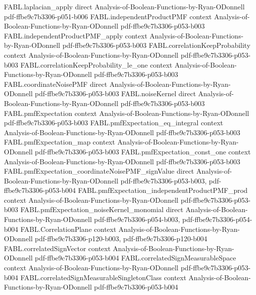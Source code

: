 \begin{theorem}
  {FABL.laplacian_apply}
  {direct}
  {Analysis-of-Boolean-Functions-by-Ryan-ODonnell}
  {pdf-ffbe9c7b3306-p051-b006}
\proofstep
  {FABL.independentProductPMF}
  {context}
  {Analysis-of-Boolean-Functions-by-Ryan-ODonnell}
  {pdf-ffbe9c7b3306-p053-b003}
\proofstep
  {FABL.independentProductPMF_apply}
  {context}
  {Analysis-of-Boolean-Functions-by-Ryan-ODonnell}
  {pdf-ffbe9c7b3306-p053-b003}
\proofstep
  {FABL.correlationKeepProbability}
  {context}
  {Analysis-of-Boolean-Functions-by-Ryan-ODonnell}
  {pdf-ffbe9c7b3306-p053-b003}
\proofstep
  {FABL.correlationKeepProbability_le_one}
  {context}
  {Analysis-of-Boolean-Functions-by-Ryan-ODonnell}
  {pdf-ffbe9c7b3306-p053-b003}
\proofstep
  {FABL.coordinateNoisePMF}
  {direct}
  {Analysis-of-Boolean-Functions-by-Ryan-ODonnell}
  {pdf-ffbe9c7b3306-p053-b003}
\proofstep
  {FABL.noiseKernel}
  {direct}
  {Analysis-of-Boolean-Functions-by-Ryan-ODonnell}
  {pdf-ffbe9c7b3306-p053-b003}
\proofstep
  {FABL.pmfExpectation}
  {context}
  {Analysis-of-Boolean-Functions-by-Ryan-ODonnell}
  {pdf-ffbe9c7b3306-p053-b003}
\proofstep
  {FABL.pmfExpectation_eq_integral}
  {context}
  {Analysis-of-Boolean-Functions-by-Ryan-ODonnell}
  {pdf-ffbe9c7b3306-p053-b003}
\proofstep
  {FABL.pmfExpectation_map}
  {context}
  {Analysis-of-Boolean-Functions-by-Ryan-ODonnell}
  {pdf-ffbe9c7b3306-p053-b003}
\proofstep
  {FABL.pmfExpectation_const_one}
  {context}
  {Analysis-of-Boolean-Functions-by-Ryan-ODonnell}
  {pdf-ffbe9c7b3306-p053-b003}
\proofstep
  {FABL.pmfExpectation_coordinateNoisePMF_signValue}
  {direct}
  {Analysis-of-Boolean-Functions-by-Ryan-ODonnell}
  {pdf-ffbe9c7b3306-p053-b003,
    pdf-ffbe9c7b3306-p053-b004}
\proofstep
  {FABL.pmfExpectation_independentProductPMF_prod}
  {context}
  {Analysis-of-Boolean-Functions-by-Ryan-ODonnell}
  {pdf-ffbe9c7b3306-p053-b003}
\proofstep
  {FABL.pmfExpectation_noiseKernel_monomial}
  {direct}
  {Analysis-of-Boolean-Functions-by-Ryan-ODonnell}
  {pdf-ffbe9c7b3306-p054-b003,
    pdf-ffbe9c7b3306-p054-b004}
\proofstep
  {FABL.CorrelationPlane}
  {context}
  {Analysis-of-Boolean-Functions-by-Ryan-ODonnell}
  {pdf-ffbe9c7b3306-p120-b003,
    pdf-ffbe9c7b3306-p120-b004}
\proofstep
  {FABL.correlatedSignVector}
  {context}
  {Analysis-of-Boolean-Functions-by-Ryan-ODonnell}
  {pdf-ffbe9c7b3306-p053-b004}
\proofstep
  {FABL.correlatedSignMeasurableSpace}
  {context}
  {Analysis-of-Boolean-Functions-by-Ryan-ODonnell}
  {pdf-ffbe9c7b3306-p053-b004}
\proofstep
  {FABL.correlatedSignMeasurableSingletonClass}
  {context}
  {Analysis-of-Boolean-Functions-by-Ryan-ODonnell}
  {pdf-ffbe9c7b3306-p053-b004}

\end{theorem}
